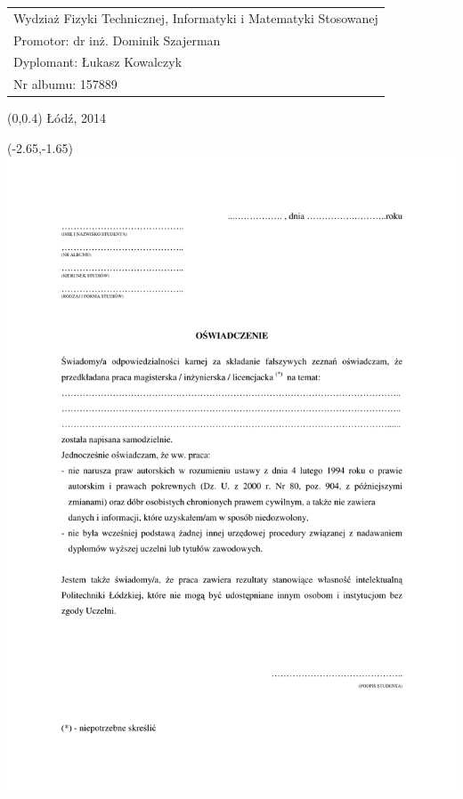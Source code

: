 \documentclass[12pt, oneside, a4paper]{mwbk}
\begin{document}
\begin{titlepage}
\begin{center}
\selectfont
\hspace{-1cm}
\begin{tabular}{l}
Wydziaż Fizyki Technicznej, Informatyki i Matematyki Stosowanej \\
Promotor: dr inż. Dominik Szajerman \\
Dyplomant: Łukasz Kowalczyk \\
Nr albumu: 157889
\end{tabular}
\end{center}
\vspace{-.5cm}
\begin{center}
\selectfont
\begin{textblock}{13}(0,0.4)
Łódź, 2014
\end{textblock}
\end{center}
\end{titlepage}

\tableofcontents




\listoffigures


\newpage
\thispagestyle{empty}
\begin{textblock}{1}(-2.65,-1.65)
\includegraphics{figures/oswiadczenie_o_samodzielnosci.pdf}
\end{textblock}
\end{document}

